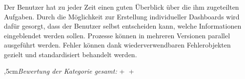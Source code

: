 Der Benutzer hat zu jeder Zeit einen guten Überblick über die ihm zugeteilten Aufgaben. Durch die Möglichkeit zur Erstellung individueller Dashboards wird dafür gesorgt, dass der Benutzer selbst entscheiden kann, welche Informationen eingeblendet werden sollen. Prozesse können in mehreren Versionen parallel ausgeführt werden. Fehler können dank wiederverwendbaren Fehlerobjekten gezielt und standardisiert behandelt werden.

\bigskip{},5cm\textit{Bewertung der Kategorie gesamt:} \hspace{5mm} \textcircled{+} \textcircled{+}
\leftskip=0cm

\small  %
\setlength\LTleft{0pt}            %
\setlength\LTright{0pt}           %
\label{oracleAusführung}
